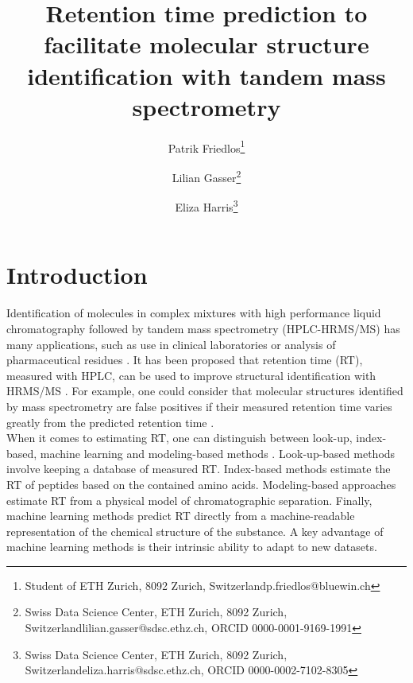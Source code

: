 \documentclass{article}
\title{Retention time prediction to facilitate molecular structure identification with tandem mass spectrometry}
\author{Patrik Friedlos\thanks{Student of ETH Zurich, 8092 Zurich, Switzerland\newline\indent\indent p.friedlos@bluewin.ch}\\
  \and Lilian Gasser\thanks{Swiss Data Science Center, ETH Zurich, 8092 Zurich, Switzerland\newline\indent\indent lilian.gasser@sdsc.ethz.ch, ORCID 0000-0001-9169-1991}
   \and Eliza Harris\thanks{Swiss Data Science Center, ETH Zurich, 8092 Zurich, Switzerland\newline\indent\indent eliza.harris@sdsc.ethz.ch, ORCID 0000-0002-7102-8305}
}
\begin{document}
\maketitle


\section{Introduction}

Identification of molecules in complex mixtures with high performance liquid chromatography followed by tandem mass spectrometry (HPLC-HRMS/MS) has many applications, such as use in clinical laboratories or analysis of pharmaceutical residues \cite{van2012role, petrovic2005liquid}. It has been proposed that retention time (RT), measured with HPLC, can be used to improve structural identification with HRMS/MS \cite{strittmatter2004application}. For example, one could consider that molecular structures identified by mass spectrometry are false positives if their measured retention time varies greatly from the predicted retention time \cite{yang2021prediction}.\\

When it comes to estimating RT, one can distinguish between look-up, index-based, machine learning and modeling-based methods \cite{moruz2017peptide}. Look-up-based methods involve keeping a database of measured RT. Index-based methods estimate the RT of peptides based on the contained amino acids. Modeling-based approaches estimate RT from a physical model of chromatographic separation. Finally, machine learning methods predict RT directly from a machine-readable representation of the chemical structure of the substance. A key advantage of machine learning methods is their intrinsic ability to adapt to new datasets.\\
\end{document}
